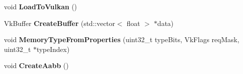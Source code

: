 \begin{DoxyCompactItemize}
\mbox{\label{class_flounder_1_1_model_afd4c7c92a9512237f73aba04dece1b13}} 
void {\bfseries Load\+To\+Vulkan} ()
\item 
\mbox{\label{class_flounder_1_1_model_a0d2c4a1deffb51fd3dc5fc995dd50502}} 
Vk\+Buffer {\bfseries Create\+Buffer} (std\+::vector$<$ float $>$ $\ast$data)
\item 
\mbox{\label{class_flounder_1_1_model_aa3720805519cc1d3ad48f9f6d6dea8e1}} 
void {\bfseries Memory\+Type\+From\+Properties} (uint32\+\_\+t type\+Bits, Vk\+Flags req\+Mask, uint32\+\_\+t $\ast$type\+Index)
\item 
\mbox{\label{class_flounder_1_1_model_a64678b7a78f77258b23434840f758f11}} 
void {\bfseries Create\+Aabb} ()
\end{DoxyCompactItemize}
